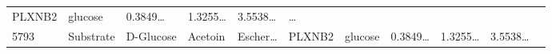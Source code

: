 \documentclass[
]{article}
\begin{document}
\begin{longtable}[]{@{}lllllllllll@{}}
\begin{minipage}[t]{0.07\columnwidth}
PLXNB2\strut
\end{minipage} & \begin{minipage}[t]{0.09\columnwidth}\raggedright
glucose\strut
\end{minipage} & \begin{minipage}[t]{0.07\columnwidth}\raggedright
0.3849\ldots{}\strut
\end{minipage} & \begin{minipage}[t]{0.07\columnwidth}\raggedright
1.3255\ldots{}\strut
\end{minipage} & \begin{minipage}[t]{0.07\columnwidth}\raggedright
3.5538\ldots{}\strut
\end{minipage} & \begin{minipage}[t]{0.03\columnwidth}\raggedright
\ldots{}\strut
\end{minipage}\tabularnewline
\begin{minipage}[t]{0.03\columnwidth}\raggedright
5793\strut
\end{minipage} & \begin{minipage}[t]{0.07\columnwidth}\raggedright
Substrate\strut
\end{minipage} & \begin{minipage}[t]{0.07\columnwidth}\raggedright
D-Glucose\strut
\end{minipage} & \begin{minipage}[t]{0.09\columnwidth}\raggedright
Acetoin\strut
\end{minipage} & \begin{minipage}[t]{0.07\columnwidth}\raggedright
Escher\ldots{}\strut
\end{minipage} & \begin{minipage}[t]{0.07\columnwidth}\raggedright
PLXNB2\strut
\end{minipage} & \begin{minipage}[t]{0.09\columnwidth}\raggedright
glucose\strut
\end{minipage} & \begin{minipage}[t]{0.07\columnwidth}\raggedright
0.3849\ldots{}\strut
\end{minipage} & \begin{minipage}[t]{0.07\columnwidth}\raggedright
1.3255\ldots{}\strut
\end{minipage} & \begin{minipage}[t]{0.07\columnwidth}\raggedright
3.5538\ldots{}\strut
\end{minipage} & \begin{minipage}[t]{0.03\columnwidth}\raggedright

\end{minipage}
\end{longtable}
\end{document}
